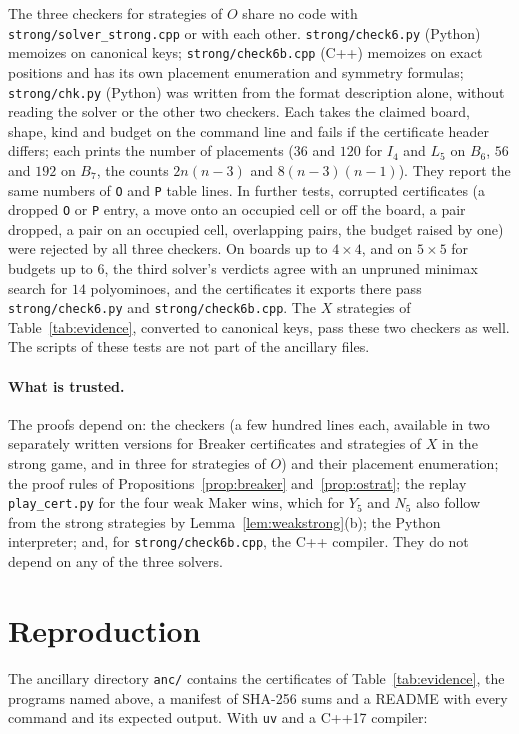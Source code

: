 \documentclass[11pt]{article}
\theoremstyle{definition}
\theoremstyle{remark}
\newcommand{\file}[1]{\texttt{#1}}
\begin{document}
The three checkers for strategies of $O$ share no code with \file{strong/solver\_strong.cpp} or with
each other. \file{strong/check6.py} (Python) memoizes on canonical keys; \file{strong/check6b.cpp}
(C++) memoizes on exact positions and has its own placement enumeration and symmetry formulas;
\file{strong/chk.py} (Python) was written from the format description alone, without reading the
solver or the other two checkers. Each takes the claimed board, shape, kind and budget on the command
line and fails if the certificate header differs; each prints the number of placements ($36$ and
$120$ for $I_4$ and $L_5$ on $B_6$, $56$ and $192$ on $B_7$, the counts $2n(n-3)$ and $8(n-3)(n-1)$).
They report the same numbers of \texttt{O} and \texttt{P} table lines. In further tests, corrupted
certificates (a dropped
\texttt{O} or \texttt{P} entry, a move onto an occupied cell or off the board, a pair dropped, a pair
on an occupied cell, overlapping pairs, the budget raised by one) were rejected by all three
checkers. On boards up to $4\times 4$, and on $5\times 5$ for budgets up to $6$, the third solver's
verdicts agree with an unpruned minimax search for $14$ polyominoes, and the certificates it exports
there pass \file{strong/check6.py} and \file{strong/check6b.cpp}. The $X$ strategies of
Table~\ref{tab:evidence}, converted to canonical keys, pass these two checkers as well. The scripts
of these tests are not part of the ancillary files.

\paragraph{What is trusted.} The proofs depend on: the checkers (a few hundred lines each,
available in two separately written versions for Breaker certificates and strategies of $X$ in the
strong game, and in three for strategies of $O$) and their placement enumeration; the proof rules of
Propositions~\ref{prop:breaker} and~\ref{prop:ostrat}; the replay \file{play\_cert.py} for the four
weak Maker wins, which for $Y_5$ and $N_5$ also follow from the strong strategies by
Lemma~\ref{lem:weakstrong}(b); the Python interpreter; and, for \file{strong/check6b.cpp}, the C++
compiler. They do not depend on any of the three solvers.

\section{Reproduction}\label{sec:repro}

The ancillary directory \file{anc/} contains the certificates of Table~\ref{tab:evidence}, the
programs named above, a manifest of SHA-256 sums and a README with every command and its expected
output. With \texttt{uv} and a C++17 compiler:
\end{document}
